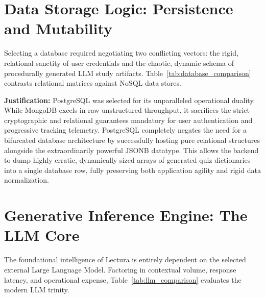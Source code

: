 \section{Data Storage Logic: Persistence and Mutability}
Selecting a database required negotiating two conflicting vectors: the rigid, relational sanctity of user credentials and the chaotic, dynamic schema of procedurally generated LLM study artifacts. Table~\ref{tab:database_comparison} contrasts relational matrices against NoSQL data stores.

\begin{table}[htbp]
\centering
{}
\vspace{6pt}
\caption{Evaluation of persistence frameworks analyzing schema elasticity.}
\label{tab:database_comparison}
\end{table}

\textbf{Justification:} PostgreSQL was selected for its unparalleled operational duality. While MongoDB excels in raw unstructured throughput, it sacrifices the strict cryptographic and relational guarantees mandatory for user authentication and progressive tracking telemetry. PostgreSQL completely negates the need for a bifurcated database architecture by successfully hosting pure relational structures alongside the extraordinarily powerful JSONB datatype. This allows the backend to dump highly erratic, dynamically sized arrays of generated quiz dictionaries into a single database row, fully preserving both application agility and rigid data normalization.

\section{Generative Inference Engine: The LLM Core}
The foundational intelligence of Lectura is entirely dependent on the selected external Large Language Model. Factoring in contextual volume, response latency, and operational expense, Table~\ref{tab:llm_comparison} evaluates the modern LLM trinity.

